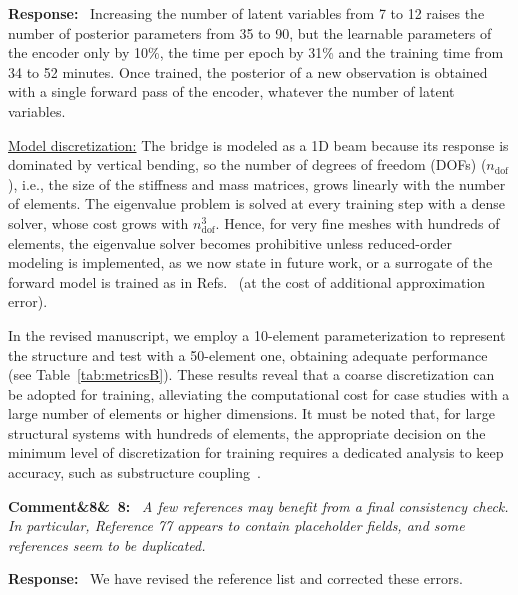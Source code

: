 \documentclass[11pt]{article}
\newenvironment{rcomment}[1]{\par\bigskip\noindent\textbf{Comment\ifx&#1&\else\ #1\fi:}\ \itshape}{\par}
\newenvironment{response}{\par\smallskip\noindent\color{resp}\textbf{Response:}\ }{\par}
\begin{document}
\begin{response}
Increasing the number of latent variables from 7 to 12 raises the number of posterior parameters from 35 to 90, but the learnable parameters of the encoder only by 10\%, the time per epoch by 31\% and the training time from 34 to 52 minutes. 
Once trained, the posterior of a new observation is obtained with a single forward pass of the encoder,
whatever the number of latent variables.

\underline{Model discretization:}
The bridge is modeled as a 1D beam because its response is dominated by vertical bending, so the number of degrees of freedom (DOFs) ($n_{\text{dof}}$), i.e., the size of the stiffness and mass matrices, grows linearly with the number of elements. 
The eigenvalue problem is solved at every training step with a dense solver, whose cost grows with $n_{\text{dof}}^3$.
Hence, for very fine meshes with hundreds of elements, the eigenvalue solver becomes prohibitive unless reduced-order modeling is implemented, as we now state in future work, or a surrogate of the forward model is trained as in Refs.~\cite{Navamuel_wes2025,Arxiv_Navamuel2026copula2d} (at the cost of additional approximation error).

 
In the revised manuscript, we employ a 10-element parameterization to represent the structure and test with a 50-element one, obtaining adequate performance (see Table~\ref{tab:metricsB}). 
These results reveal that a coarse discretization can be adopted for training, alleviating the computational cost for case studies with a large number of elements or higher dimensions. 
It must be noted that, for large structural systems with hundreds of elements, the appropriate decision on the minimum level of discretization for training requires a dedicated analysis to keep accuracy, such as substructure coupling~\cite{jensen2019sub}. 


\end{response}

\begin{rcomment}{8}
A few references may benefit from a final consistency check. In particular, Reference 77 appears to contain placeholder fields, and some references seem to be duplicated.
\end{rcomment}

\begin{response}
We have revised the reference list and corrected these errors.
\end{response}
\end{document}
